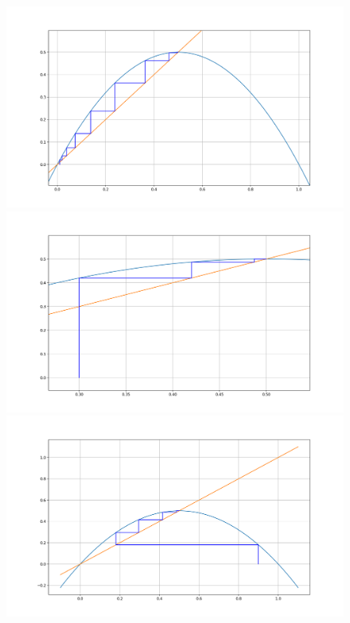 \documentclass[12pt]{article}
\theoremstyle{plain}
\begin{document}
\begin{figure}[H]
\begin{minipage}[c][0.6\width]{
   0.5\textwidth}
   \centering
   \includegraphics[width=1\textwidth]{figure/section1/cb01.png}
\end{minipage}
\begin{minipage}[c][0.6\width]{
   0.5\textwidth}
   \centering
   \includegraphics[width=1\textwidth]{figure/section1/cb02.png}
\end{minipage}
\begin{minipage}[c][0.6\width]{
   0.5\textwidth}
   \centering
   \includegraphics[width=1\textwidth]{figure/section1/cb03.png}

\end{minipage}
\end{figure}
\end{document}
